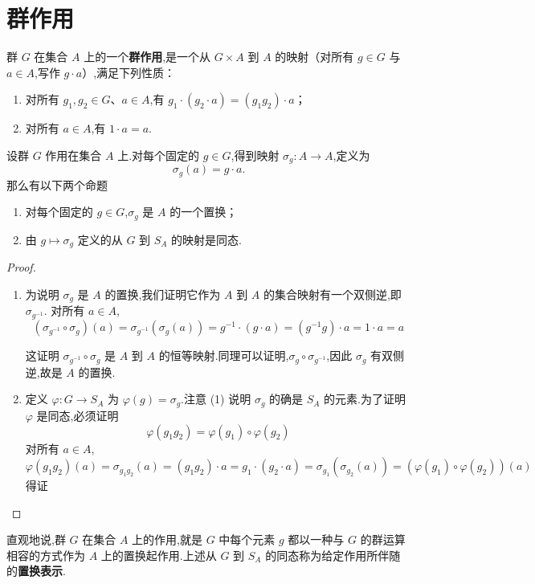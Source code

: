 \section{群作用}
\begin{definition}
	群 $G$ 在集合 $A$ 上的一个\textbf{群作用},是一个从 $G\times A$ 到 $A$ 的映射（对所有 $g\in G$ 与 $a\in A$,写作 $g\cdot a$）,满足下列性质：
\begin{enumerate}[label=(\arabic*)]
	\item 对所有 $g_1,g_2\in G$、$a\in A$,有 $g_1\cdot(g_2\cdot a)=(g_1g_2)\cdot a$；
	\item 对所有 $a\in A$,有 $1\cdot a=a$.
\end{enumerate}
\end{definition}
设群 $G$ 作用在集合 $A$ 上.对每个固定的 $g\in G$,得到映射 $\sigma_g:A\to A$,定义为
\[
\sigma_g(a)=g\cdot a.
\]
那么有以下两个命题
\begin{proposition}
	\begin{enumerate}[label=(\arabic*)]
	\item 对每个固定的 $g\in G$,$\sigma_g$ 是 $A$ 的一个置换；
	\item 由 $g\mapsto\sigma_g$ 定义的从 $G$ 到 $S_A$ 的映射是同态.
\end{enumerate}
\end{proposition}

\begin{proof}
	\begin{enumerate}[label=(\arabic*)]
		\item 	为说明 $\sigma_g$ 是 $A$ 的置换,我们证明它作为 $A$ 到 $A$ 的集合映射有一个双侧逆,即 $\sigma_{g^{-1}}$.
		对所有 $a\in A$,
		\[ (\sigma_{g^{-1}}\circ\sigma_g)(a)
		=\sigma_{g^{-1}}(\sigma_g(a)) 
		=g^{-1}\cdot(g\cdot a) =(g^{-1}g)\cdot a =1\cdot a=a  \]
		
		这证明 $\sigma_{g^{-1}}\circ\sigma_g$ 是 $A$ 到 $A$ 的恒等映射.同理可以证明,$\sigma_{g}\circ\sigma_{g^{-1}}$,因此 $\sigma_g$ 有双侧逆,故是 $A$ 的置换.
		
		\item 定义 $\varphi:G\to S_A$ 为 $\varphi(g)=\sigma_g$.注意 (1) 说明 $\sigma_g$ 的确是 $S_A$ 的元素.为了证明 $\varphi$ 是同态,必须证明
		\[
		\varphi(g_1g_2)=\varphi(g_1)\circ\varphi(g_2)
		\]
		对所有 $a\in A$,
		\[ \varphi(g_1g_2)(a)
			=\sigma_{g_1g_2}(a) =(g_1g_2)\cdot a =g_1\cdot(g_2\cdot a) =\sigma_{g_1}(\sigma_{g_2}(a)) =(\varphi(g_1)\circ\varphi(g_2))(a)  \]
		得证
	\end{enumerate}
\end{proof}
直观地说,群 $G$ 在集合 $A$ 上的作用,就是 $G$ 中每个元素 $g$ 都以一种与 $G$ 的群运算相容的方式作为 $A$ 上的置换起作用.上述从 $G$ 到 $S_A$ 的同态称为给定作用所伴随的\textbf{置换表示}.

